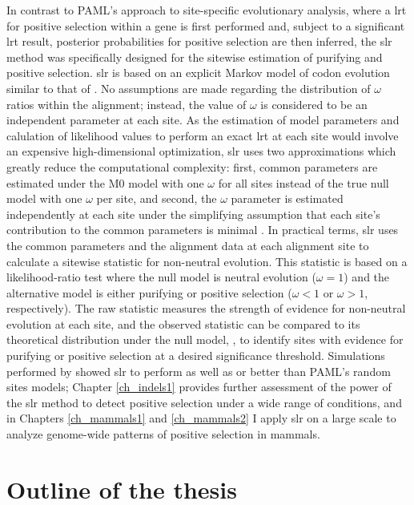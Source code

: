 In contrast to PAML's approach to site-specific evolutionary analysis,
where a \ac{lrt} for positive selection within a gene is first
performed and, subject to a significant \ac{lrt} result, \sw posterior
probabilities for positive selection are then inferred, the \ac{slr}
method \citep{Massingham2005} was specifically designed for the
sitewise estimation of purifying and positive selection. \ac{slr} is
based on an explicit Markov model of codon evolution similar to that
of \citet{Goldman1994a}. No assumptions are made regarding the
distribution of $\omega$ ratios within the alignment; instead, the
value of $\omega$ is considered to be an independent parameter at each
site. As the estimation of model parameters and calulation of
likelihood values to perform an exact \ac{lrt} at each site would
involve an expensive high-dimensional optimization, \ac{slr} uses two
approximations which greatly reduce the computational complexity:
first, common parameters are estimated under the M0 model
\citep{Yang2000CodonSubstitution} with one $\omega$ for all sites
instead of the true null model with one $\omega$ per site, and second,
the \sw $\omega$ parameter is estimated independently at each site
under the simplifying assumption that each site's contribution to the
common parameters is minimal \citep{Massingham2005}. In practical
terms, \ac{slr} uses the common parameters and the alignment data at
each alignment site to calculate a sitewise statistic for non-neutral
evolution. This statistic is based on a likelihood-ratio test where
the null model is neutral evolution ($\omega=1$) and the alternative
model is either purifying or positive selection ($\omega<1$ or
$\omega>1$, respectively). The raw statistic measures the strength of
evidence for non-neutral evolution at each site, and the observed
statistic can be compared to its theoretical distribution under the
null model, \chisq, to identify sites with evidence for purifying or
positive selection at a desired significance threshold. Simulations
performed by \citet{Massingham2005} showed \ac{slr} to perform as well
as or better than PAML’s random sites models; Chapter \ref{ch_indels1}
provides further assessment of the power of the \ac{slr} method to
detect \sw positive selection under a wide range of conditions, and in
Chapters \ref{ch_mammals1} and \ref{ch_mammals2} I apply \ac{slr} 
on a large scale to analyze genome-wide patterns of \sw positive
selection in mammals.

\section{Outline of the thesis}

